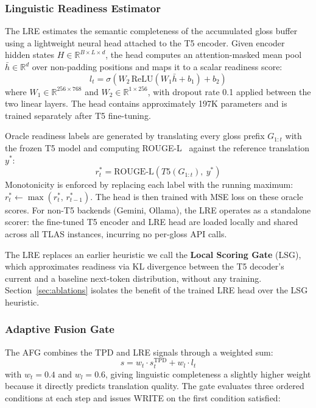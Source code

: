 \documentclass[conference]{IEEEtran}
\begin{document}
\subsubsection{Linguistic Readiness Estimator}

The LRE estimates the semantic completeness of the accumulated gloss buffer using a lightweight neural head attached to the T5 encoder. Given encoder hidden states $H \in \mathbb{R}^{B \times L \times d}$, the head computes an attention-masked mean pool $\bar{h} \in \mathbb{R}^d$ over non-padding positions and maps it to a scalar readiness score:
\begin{equation}
    l_t = \sigma\!\left(W_2\, \text{ReLU}(W_1 \bar{h} + b_1) + b_2\right)
    \label{eq:lre}
\end{equation}
where $W_1 \in \mathbb{R}^{256 \times 768}$ and $W_2 \in \mathbb{R}^{1 \times 256}$, with dropout rate 0.1 applied between the two linear layers. The head contains approximately 197K parameters and is trained separately after T5 fine-tuning.

Oracle readiness labels are generated by translating every gloss prefix $G_{1:t}$ with the frozen T5 model and computing ROUGE-L~\cite{lin2004rouge} against the reference translation $y^*$:
\begin{equation}
    r_t^* = \text{ROUGE-L}\!\left(T5(G_{1:t}),\ y^*\right)
    \label{eq:oracle}
\end{equation}
Monotonicity is enforced by replacing each label with the running maximum: $r_t^* \leftarrow \max(r_t^*,\, r_{t-1}^*)$. The head is then trained with MSE loss on these oracle scores. For non-T5 backends (Gemini, Ollama), the LRE operates as a standalone scorer: the fine-tuned T5 encoder and LRE head are loaded locally and shared across all TLAS instances, incurring no per-gloss API calls.

The LRE replaces an earlier heuristic we call the \textbf{Local Scoring Gate} (LSG), which approximates readiness via KL divergence between the T5 decoder's current and a baseline next-token distribution, without any training. Section~\ref{sec:ablations} isolates the benefit of the trained LRE head over the LSG heuristic.

\subsubsection{Adaptive Fusion Gate}

The AFG combines the TPD and LRE signals through a weighted sum:
\begin{equation}
    s = w_t \cdot s_t^{\text{TPD}} + w_l \cdot l_t
    \label{eq:afg}
\end{equation}
with $w_t = 0.4$ and $w_l = 0.6$, giving linguistic completeness a slightly higher weight because it directly predicts translation quality. The gate evaluates three ordered conditions at each step and issues WRITE on the first condition satisfied:
\end{document}
